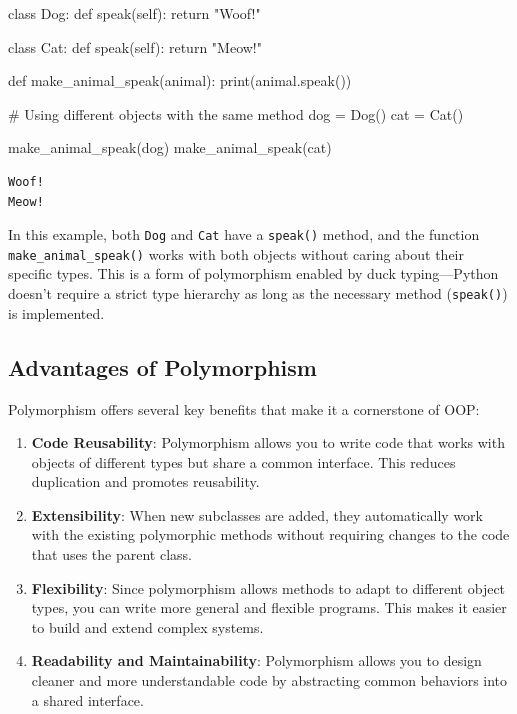 \documentclass[
  letterpaper,
  DIV=11,
  numbers=noendperiod]{scrreprt}
\newenvironment{Shaded}{\begin{snugshade}}{\end{snugshade}}
\newcommand{\BuiltInTok}[1]{\textcolor[rgb]{0.00,0.23,0.31}{#1}}
\newcommand{\CommentTok}[1]{\textcolor[rgb]{0.37,0.37,0.37}{#1}}
\newcommand{\ControlFlowTok}[1]{\textcolor[rgb]{0.00,0.23,0.31}{#1}}
\newcommand{\KeywordTok}[1]{\textcolor[rgb]{0.00,0.23,0.31}{#1}}
\newcommand{\NormalTok}[1]{\textcolor[rgb]{0.00,0.23,0.31}{#1}}
\newcommand{\OperatorTok}[1]{\textcolor[rgb]{0.37,0.37,0.37}{#1}}
\newcommand{\StringTok}[1]{\textcolor[rgb]{0.13,0.47,0.30}{#1}}
\newcommand{\VariableTok}[1]{\textcolor[rgb]{0.07,0.07,0.07}{#1}}
\begin{document}
\begin{Shaded}
\begin{Highlighting}[]
\KeywordTok{class}\NormalTok{ Dog:}
    \KeywordTok{def}\NormalTok{ speak(}\VariableTok{self}\NormalTok{):}
        \ControlFlowTok{return} \StringTok{"Woof!"}

\KeywordTok{class}\NormalTok{ Cat:}
    \KeywordTok{def}\NormalTok{ speak(}\VariableTok{self}\NormalTok{):}
        \ControlFlowTok{return} \StringTok{"Meow!"}

\KeywordTok{def}\NormalTok{ make\_animal\_speak(animal):}
    \BuiltInTok{print}\NormalTok{(animal.speak())}

\CommentTok{\# Using different objects with the same method}
\NormalTok{dog }\OperatorTok{=}\NormalTok{ Dog()}
\NormalTok{cat }\OperatorTok{=}\NormalTok{ Cat()}

\NormalTok{make\_animal\_speak(dog) }
\NormalTok{make\_animal\_speak(cat)  }
\end{Highlighting}
\end{Shaded}

\begin{verbatim}
Woof!
Meow!
\end{verbatim}

In this example, both \texttt{Dog} and \texttt{Cat} have a
\texttt{speak()} method, and the function \texttt{make\_animal\_speak()}
works with both objects without caring about their specific types. This
is a form of polymorphism enabled by duck typing---Python doesn't
require a strict type hierarchy as long as the necessary method
(\texttt{speak()}) is implemented.

\hypertarget{advantages-of-polymorphism}{%
\subsection{Advantages of
Polymorphism}\label{advantages-of-polymorphism}}

Polymorphism offers several key benefits that make it a cornerstone of
OOP:

\begin{enumerate}
\def\labelenumi{\arabic{enumi}.}
\item
  \textbf{Code Reusability}: Polymorphism allows you to write code that
  works with objects of different types but share a common interface.
  This reduces duplication and promotes reusability.
\item
  \textbf{Extensibility}: When new subclasses are added, they
  automatically work with the existing polymorphic methods without
  requiring changes to the code that uses the parent class.
\item
  \textbf{Flexibility}: Since polymorphism allows methods to adapt to
  different object types, you can write more general and flexible
  programs. This makes it easier to build and extend complex systems.
\item
  \textbf{Readability and Maintainability}: Polymorphism allows you to
  design cleaner and more understandable code by abstracting common
  behaviors into a shared interface.
\end{enumerate}
\end{document}
